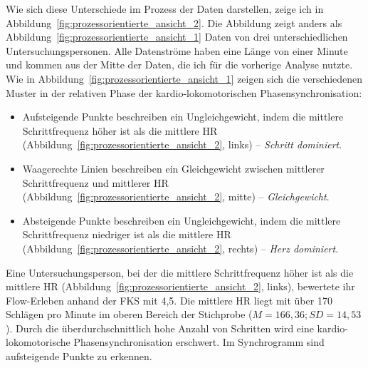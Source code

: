 Wie sich diese Unterschiede im Prozess der Daten darstellen, zeige ich in Abbildung~\ref{fig:prozessorientierte_ansicht_2}. Die Abbildung zeigt anders als Abbildung~\ref{fig:prozessorientierte_ansicht_1} Daten von drei unterschiedlichen Untersuchungspersonen. Alle Datenströme haben eine Länge von einer Minute und kommen aus der Mitte der Daten, die ich für die vorherige Analyse nutzte. Wie in Abbildung~\ref{fig:prozessorientierte_ansicht_1} zeigen sich die verschiedenen Muster in der relativen Phase der kardio-lokomotorischen Phasensynchronisation: 
\begin{itemize}
	
	\item Aufsteigende Punkte beschreiben ein Ungleichgewicht, indem die mittlere Schrittfrequenz höher ist als die mittlere \ac{HR} (Abbildung~\ref{fig:prozessorientierte_ansicht_2}, links) -- \emph{Schritt dominiert}.
	
	\item Waagerechte Linien beschreiben ein Gleichgewicht zwischen mittlerer Schrittfrequenz und mittlerer \ac{HR} (Abbildung~\ref{fig:prozessorientierte_ansicht_2}, mitte) -- \emph{Gleichgewicht}.
	
	\item Absteigende Punkte beschreiben ein Ungleichgewicht, indem die mittlere Schrittfrequenz niedriger ist als die mittlere \ac{HR} (Abbildung~\ref{fig:prozessorientierte_ansicht_2}, rechts) -- \emph{Herz dominiert}. 
\end{itemize}

Eine Untersuchungsperson, bei der die mittlere Schrittfrequenz höher ist als die mittlere \ac{HR} (Abbildung~\ref{fig:prozessorientierte_ansicht_2}, links), bewertete ihr Flow-Erleben anhand der \ac{FKS} mit 4,5. Die mittlere \ac{HR} liegt mit über 170 Schlägen pro Minute im oberen Bereich der Stichprobe ($M = 166{,}36; SD = 14{,}53$). Durch die überdurchschnittlich hohe Anzahl von Schritten wird eine kardio-lokomotorische Phasensynchronisation erschwert. Im Synchrogramm sind aufsteigende Punkte zu erkennen.
\begin{sidewaysfigure}
	 \caption[Beispielhafte Prozessdarstellung von mehreren Untersuchungspersonen]{Beispielhafte Prozessdarstellung -- eine Minute Daten einer Untersuchungsperson der Gruppe Schritt dominiert (links), einer Untersuchungsperson Geleichgewicht (mitte) und einer Untersuchungsperson der Gruppe Herz dominert (rechts) \\
	\hspace{ 
	\textwidth}\emph{Anmerkung}: Mittlere SF = Mittlere Schrittfrequenz \\
	\hspace{ 
	\textwidth} Rel. Phase = Relative Phase} \label{fig:prozessorientierte_ansicht_2} 
\end{sidewaysfigure}

